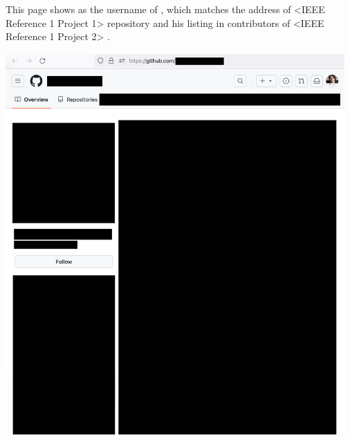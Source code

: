 
This page shows  as the username of \MrIeeeReferenceOne,
which matches the address of <IEEE Reference 1 Project 1> repository 
and his listing in contributors of <IEEE Reference 1 Project 2> .

\begin{center}
    \includegraphics[width=35em]{ieee-reference-one-github_public}
\end{center}

\pagebreak
